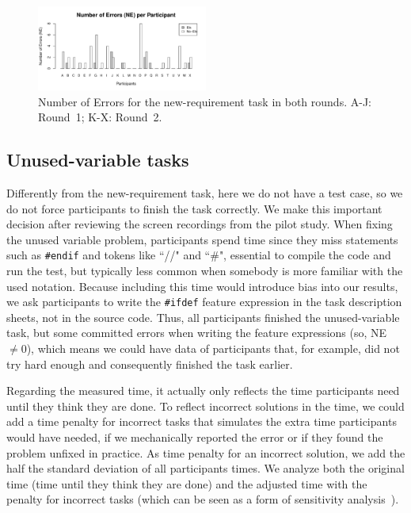 \begin{figure}[tp]
\centering
\includegraphics[width=0.5\textwidth]{images/Barplot-NE.pdf}
\caption{Number of Errors for the new-requirement task in both rounds. A-J: Round~1; K-X: Round~2.}
\label{fig:barplot-ne}
\end{figure}

\subsection{Unused-variable tasks}

Differently from the new-requirement task, here we do not have a test case, so we do not force participants to finish the task correctly. We make this important decision after reviewing the screen recordings from the pilot study. When fixing the unused variable problem, participants spend time since they miss statements such as \texttt{\#endif} and tokens like ``//" and ``\#", essential to compile the code and run the test, but typically less common when somebody is more familiar with the used notation. Because including this time would introduce bias into our results, we ask participants to write the \texttt{\#ifdef} feature expression in the task description sheets, not in the source code.
Thus, all participants finished the unused-variable task, but some committed errors when writing the feature expressions (so, NE $\neq 0$), which means we could have data of participants that, for example, did not try hard enough and consequently finished the task earlier. 

Regarding the measured time, it actually only reflects the time participants need until they think they are done.
To reflect incorrect solutions in the time, we could add a time penalty for incorrect tasks that simulates the extra time participants would have needed, if we mechanically reported the error or if they found the problem unfixed in practice.
As time penalty for an incorrect solution, we add the half the standard deviation of all participants times. We analyze both the original time (time until they think they are done) and the adjusted time with the penalty for incorrect tasks (which can be seen as a form of sensitivity analysis~\cite{statistics-sensitivity-analysis-book}).

